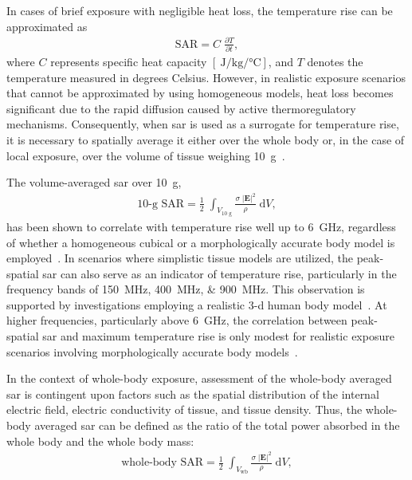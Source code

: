 In cases of brief exposure with negligible heat loss, the temperature rise can be approximated as
\begin{align}
    \label{eqn:sar_4}
    \text{SAR} = C \; \frac{\partial T}{\partial t},
\end{align}
where $C$ represents specific heat capacity $\left[ \SI{}{\joule\per\kg\per\celsius} \right]$, and $T$ denotes the temperature measured in degrees Celsius.
However, in realistic exposure scenarios that cannot be approximated by using homogeneous models, heat loss becomes significant due to the rapid diffusion caused by active thermoregulatory mechanisms.
Consequently, when \gls{sar} is used as a surrogate for temperature rise, it is necessary to spatially average it either over the whole body or, in the case of local exposure, over the volume of tissue weighing \SI{10}{\g}~\cite{McIntosh2011SAR}.

The volume-averaged \gls{sar} over \SI{10}{\g},
\begin{align}
    \text{10-g SAR} = \frac{1}{2} \; \int_{V_\text{10 g}} \frac{\sigma \; \left |\mathbf{E} \right|^2}{\rho} \; \mathrm{d}V,
\end{align}
has been shown to correlate with temperature rise well up to \SI{6}{\GHz}, regardless of whether a homogeneous cubical or a morphologically accurate body model is employed~\cite{Hirata2009correlation}.
In scenarios where simplistic tissue models are utilized, the peak-spatial \gls{sar} can also serve as an indicator of temperature rise, particularly in the frequency bands of \SIlist{150;400;900}{\MHz}.
This observation is supported by investigations employing a realistic \gls{3-d} human body model~\cite{Hirata2006Correlation}.
At higher frequencies, particularly above \SI{6}{\GHz}, the correlation between peak-spatial \gls{sar} and maximum temperature rise is only modest for realistic exposure scenarios involving morphologically accurate body models~\cite{Morimoto2016Relationship}.

In the context of whole-body exposure, assessment of the whole-body averaged \gls{sar} is contingent upon factors such as the spatial distribution of the internal electric field, electric conductivity of tissue, and tissue density.
Thus, the whole-body averaged \gls{sar} can be defined as the ratio of the total power absorbed in the whole body and the whole body mass:
\begin{align}
    \label{eqn:sar_wb}
    \text{whole-body SAR} = \frac{1}{2} \; \int_{V_\text{wb}}\frac{\sigma \; \left |\mathbf{E} \right|^2}{\rho} \; \mathrm{d}V,
\end{align}

